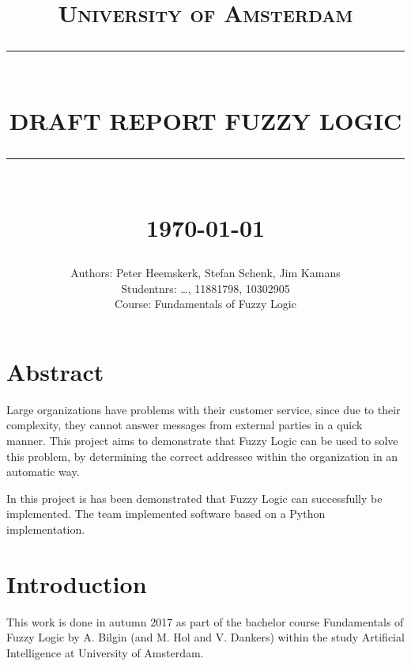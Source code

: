\documentclass[a4paper]{article}
\newcommand{\HRule}[1]{\rule{\linewidth}{#1}}
\begin{document}
\title{ \normalsize \textsc{University of Amsterdam}
    \\ [2.0cm]
    \HRule{0.5pt} \\
    \LARGE \textbf{\uppercase{Draft Report Fuzzy Logic}}
    \HRule{2pt} \\ [0.5cm]
    \normalsize \today \vspace*{5\baselineskip}}

\date{}

\author{
    Authors: Peter Heemskerk, Stefan Schenk, Jim Kamans \\
    Studentnrs: \dots, 11881798, 10302905 \\
        Course: Fundamentals of Fuzzy Logic}

\maketitle
\newpage

\tableofcontents
\newpage

\sectionfont{\scshape}

\section{Abstract}

Large organizations have problems with their customer service, since due to their complexity, they cannot answer messages from external parties in a quick manner. This project aims to demonstrate that Fuzzy Logic can be used to solve this problem, by determining the correct addressee within the organization in an automatic way.

In this project is has been demonstrated that Fuzzy Logic can successfully be implemented. The team implemented software based on a Python implementation.

\section{Introduction}

This work is done in autumn 2017 as part of the bachelor course Fundamentals of Fuzzy Logic by A. Bilgin (and  M. Hol and V. Dankers) within the study Artificial Intelligence at University of Amsterdam.
\end{document}
